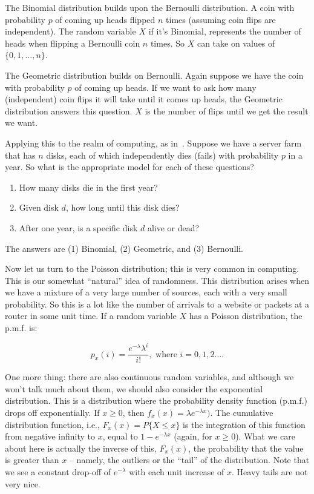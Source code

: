 \documentclass[a4paper]{report}
\begin{document}
The Binomial distribution builds upon the Bernoulli distribution. A coin with probability $p$ of coming up heads flipped $n$ times (assuming coin flips are independent). The random variable $X$ if it's Binomial, represents the number of heads when flipping a Bernoulli coin $n$ times. So $X$ can take on values of $\{0, 1, \ldots, n\}$. 

The Geometric distribution builds on Bernoulli. Again suppose we have the coin with probability $p$ of coming up heads. If we want to ask how many (independent) coin flips it will take until it comes up heads, the Geometric distribution answers this question. $X$ is the number of flips until we get the result we want.

Applying this to the realm of computing, as in~\cite{pmd}. Suppose we have a server farm that has $n$ disks, each of which independently dies (fails) with probability $p$ in a year. So what is the appropriate model for each of these questions?

\begin{enumerate}
	\item How many disks die in the first year?
	\item Given disk $d$, how long until this disk dies?
	\item After one year, is a specific disk $d$ alive or dead?
\end{enumerate}

The answers are (1) Binomial, (2) Geometric, and (3) Bernoulli.

Now let us turn to the Poisson distribution; this is very common in computing. This is our somewhat ``natural'' idea of randomness. This distribution arises when we have a mixture of a very large number of sources, each with a very small probability. So this is a lot like the number of arrivals to a website or packets at a router in some unit time. If a random variable $X$ has a Poisson distribution, the p.m.f. is:

\[
	p_{x}(i) = \dfrac{e^{-\lambda}\lambda^{i}}{i!},\mbox{ where $i = 0, 1, 2\ldots$}.
\]

One more thing: there are also continuous random variables, and although we won't talk much about them, we should also consider the exponential distribution. This is a distribution where the probability density function (p.m.f.) drops off exponentially. If $x \geq 0$, then $f_{x}(x) = \lambda e^{-\lambda x})$. The cumulative distribution function, i.e., $F_{x}(x) = P\{ X \leq x \}$ is the integration of this function from negative infinity to $x$, equal to $1-e^{-\lambda x}$ (again, for $x \geq 0$). What we care about here is actually the inverse of this, $\overline{F_{x}}(x)$, the probability that the value is greater than $x$ -- namely, the outliers or the ``tail'' of the distribution. Note that we see a constant drop-off of $e^{-\lambda}$ with each unit increase of $x$. Heavy tails are not very nice. 
\end{document}
